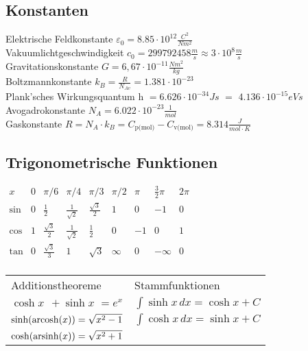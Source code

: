 \documentclass[fs, footer]{latex4ei}
\begin{document}
\begin{multicols*}{4}
\subsection{Konstanten}
Elektrische Feldkonstante $ \varepsilon_0 = 8.85\cdot 10^{12} \frac{C^2}{Nm^2}$\\
Vakuumlichtgeschwindigkeit $ c_0 = 299 792 458 \frac{m}{s} \approx 3\cdot 10^8 \frac{m}{s}$\\
Gravitationskonstante $G = 6,67\cdot 10^{-11} \frac{Nm^2}{kg}$\\
Boltzmannkonstante $k_B = \frac{R}{N_{Av}} = 1.381\cdot 10^{-23}$\\
Plank'sches Wirkungsquantum h $= 6.626\cdot 10^{-34}Js$ \hspace*{38.2mm} $=$  \hspace*{4mm} $4.136\cdot 10^{-15}eVs$\\
Avogadrokonstante $N_A = 6.022 \cdot 10^{-23} \frac{1}{mol}$\\
Gaskonstante $R = N_A \cdot k_B = C_{\text{p(mol)}} - C_{\text{v(mol)}} = 8.314 \frac{J}{mol\cdot K}$\\


\subsection{Trigonometrische Funktionen}

$\begin{array}{c|c|c|c|c|c|c|c|c}
x & 0 & \pi / 6 & \pi / 4 & \pi / 3 & \pi / 2 & \pi & \frac{3}{2}\pi & 2 \pi \\ \hline
\sin & 0 & \frac{1}{2} & \frac{1}{\sqrt{2}} & \frac{\sqrt 3}{2} & 1 & 0 & -1 & 0 \\
\cos & 1 & \frac{\sqrt 3}{2} & \frac{1}{\sqrt 2} & \frac{1}{2} & 0 & -1 & 0 & 1 \\     
\tan & 0 & \frac{\sqrt{3}}{3}&	1				 &	\sqrt{3} & \infty & 0 & - \infty & 0\\
\end{array}$ 

\iffalse
\begin{tabular}{l  l} 
		Additionstheoreme &	Stammfunktionen \\
	$\cosh x \,\; + \sinh x \,\,= e^{x}$ & $\int \sinh x \, dx = \cosh x + C$\\
	$\sinh({\rm arcosh}(x)) = \sqrt{x^2 - 1}$ & $\int \cosh x \, dx = \sinh x + C $\\
	$\cosh({\rm arsinh}(x)) = \sqrt{x^2 + 1}$ \\
	

\end{tabular}
\end{multicols*}
\end{document}
